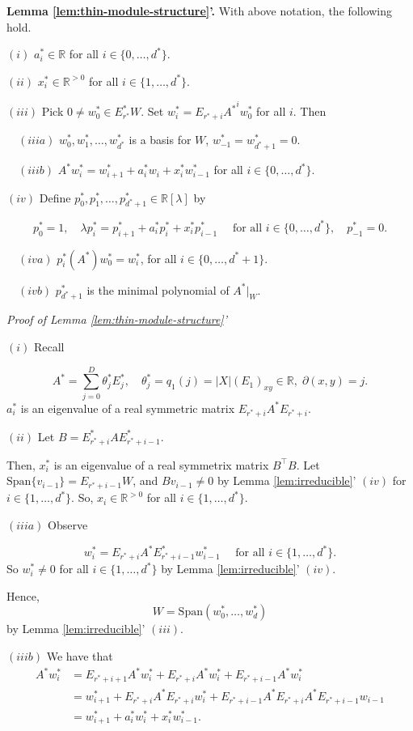\documentclass[
]{book}
\theoremstyle{definition}
\theoremstyle{definition}
\theoremstyle{definition}
\theoremstyle{definition}
\theoremstyle{remark}
\begin{document}
\textbf{Lemma \ref{lem:thin-module-structure}'.}
With above notation, the following hold.

\((i)\) \(a^*_i\in \mathbb{R}\) for all \(i\in \{0, \ldots, d^*\}\).

\((ii)\) \(x^*_i\in \mathbb{R}^{>0}\) for all \(i\in \{1, \ldots, d^*\}\).

\((iii)\) Pick \(0\neq w^*_0\in E^*_{r^*}W\). Set \(w^*_i = E_{r^*+i}{A^*}^iw^*_0\) for all \(i\). Then

\(\quad (iiia)\) \(w^*_0, w^*_1, \ldots, w^*_{d^*}\) is a basis for \(W\), \(w^*_{-1} = w^*_{d^*+1} = 0\).

\(\quad (iiib)\) \(A^*w^*_i = w^*_{i+1} + a^*_iw_{i} + x^*_iw^*_{i-1}\) for all \(i\in \{0, \ldots, d^*\}\).

\((iv)\) Define \(p^*_0, p^*_1, \ldots, p^*_{d^*+1}\in \mathbb{R}[\lambda]\) by

\[p^*_0 = 1, \quad \lambda p^*_i = p^*_{i+1} + a^*_i p^*_i + x^*_i p^*_{i-1} \quad \text{ for all } i\in \{0, \ldots, d^*\}, \quad p^*_{-1} = 0.\]

\(\quad (iva)\) \(p^*_i(A^*)w^*_0 = w^*_i\), for all \(i\in \{0, \ldots, d^*+1\}\).

\(\quad (ivb)\) \(p^*_{d^*+1}\) is the minimal polynomial of \(A^*|_W\).

\emph{Proof of Lemma \ref{lem:thin-module-structure}'}

\((i)\) Recall

\[A^* = \sum_{j=0}^D\theta^*_jE^*_j, \quad \theta^*_j = q_1(j) = |X|(E_1)_{xy}\in \mathbb{R}, \; \partial(x,y)=j.\]
\(a_i^*\) is an eigenvalue of a real symmetric matrix \(E_{r^*+i}A^*E_{r^*+i}\).

\((ii)\) Let \(B = E^*_{r^*+i}AE^*_{r^*+i-1}\).

Then, \(x^*_i\) is an eigenvalue of a real symmetrix matrix \(B^\top B\).
Let \(\mathrm{Span}\{v_{i-1}\} = E_{r^*+i-1}W\), and \(Bv_{i-1}\neq 0\) by Lemma \ref{lem:irreducible}' \((iv)\) for \(i\in \{1, \ldots, d^*\}\). So, \(x_i\in \mathbb{R}^{>0}\) for all \(i\in \{1, \ldots, d^*\}\).

\((iiia)\) Observe

\[w^*_i = E_{r^*+i}A^*E^*_{r^*+i-1}w^*_{i-1} \quad \text{ for all }i\in \{1, \ldots, d^*\}.\]
So \(w^*_i \neq 0\) for all \(i\in \{1, \ldots, d^*\}\) by Lemma \ref{lem:irreducible}' \((iv)\).

Hence,
\[W = \mathrm{Span}(w^*_0, \ldots, w^*_d)\]
by Lemma \ref{lem:irreducible}' \((iii)\).

\((iiib)\) We have that
\begin{align}
A^*w^*_i & = E_{r^*+i+1}A^*w^*_i + E_{r^*+i}A^*w^*_i + E_{r^*+i-1}A^*w^*_i\\
& = w^*_{i+1} + E_{r^*+i}A^*E_{r^*+i}w^*_i + E_{r^*+i-1}A^*E_{r^*+i}A^*E_{r^*+i-1}w_{i-1}\\
& = w^*_{i+1} + a^*_iw^*_{i} + x^*_iw^*_{i-1}.
\end{align}
\end{document}
